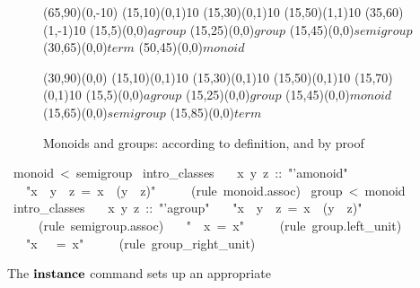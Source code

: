 \begin{isabelle}
\begin{isamarkuptext}
 \begin{figure}[htbp]
   \begin{center}
     \small
     \unitlength 0.6mm
     \begin{picture}(65,90)(0,-10)
       \put(15,10){\line(0,1){10}} \put(15,30){\line(0,1){10}}
       \put(15,50){\line(1,1){10}} \put(35,60){\line(1,-1){10}}
       \put(15,5){\makebox(0,0){$agroup$}}
       \put(15,25){\makebox(0,0){$group$}}
       \put(15,45){\makebox(0,0){$semigroup$}}
       \put(30,65){\makebox(0,0){$term$}} \put(50,45){\makebox(0,0){$monoid$}}
     \end{picture}
     \hspace{4em}
     \begin{picture}(30,90)(0,0)
       \put(15,10){\line(0,1){10}} \put(15,30){\line(0,1){10}}
       \put(15,50){\line(0,1){10}} \put(15,70){\line(0,1){10}}
       \put(15,5){\makebox(0,0){$agroup$}}
       \put(15,25){\makebox(0,0){$group$}}
       \put(15,45){\makebox(0,0){$monoid$}}
       \put(15,65){\makebox(0,0){$semigroup$}}
       \put(15,85){\makebox(0,0){$term$}}
     \end{picture}
     \caption{Monoids and groups: according to definition, and by proof}
     \label{fig:monoid-group}
   \end{center}
 \end{figure}%
\end{isamarkuptext}%
\ monoid\ <\ semigroup\isanewline
{}\ intro\_classes\isanewline
\ \ \ x\ y\ z\ ::\ {"}'a{\isasymColon}monoid{"}\isanewline
\ \ \ {"}x\ {\isasymOtimes}\ y\ {\isasymOtimes}\ z\ =\ x\ {\isasymOtimes}\ (y\ {\isasymOtimes}\ z){"}\isanewline
\ \ \ \ \ (rule\ monoid.assoc)\isanewline
{}\isanewline
\isanewline
{}\ group\ <\ monoid\isanewline
{}\ intro\_classes\isanewline
\ \ \ x\ y\ z\ ::\ {"}'a{\isasymColon}group{"}\isanewline
\ \ \ {"}x\ {\isasymOtimes}\ y\ {\isasymOtimes}\ z\ =\ x\ {\isasymOtimes}\ (y\ {\isasymOtimes}\ z){"}\isanewline
\ \ \ \ \ (rule\ semigroup.assoc)\isanewline
\ \ \ {"}{\isasymunit}\ {\isasymOtimes}\ x\ =\ x{"}\isanewline
\ \ \ \ \ (rule\ group.left\_unit)\isanewline
\ \ \ {"}x\ {\isasymOtimes}\ {\isasymunit}\ =\ x{"}\isanewline
\ \ \ \ \ (rule\ group\_right\_unit)\isanewline
{}%
\begin{isamarkuptext}%
\medskip The $\emph{\bf instance}$ command sets up an appropriate

\end{isamarkuptext}
\end{isabelle}
